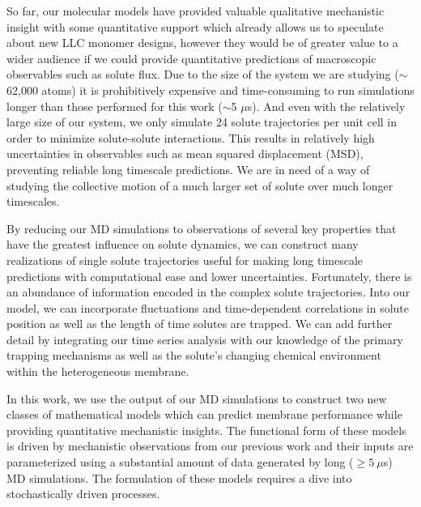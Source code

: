 \documentclass{article}
\begin{document}
  So far, our molecular models have provided valuable qualitative mechanistic insight 
  with some quantitative support which already allows us to speculate about new LLC
  monomer designs, however they would be of greater value to a wider audience if we 
  could provide quantitative predictions of macroscopic observables such as solute 
  flux. Due to the size of the system we are studying ($\sim$62,000 atoms) it is 
  prohibitively expensive and time-consuming to run simulations longer than 
  those performed for this work ($\sim$5 $\mu$s). And even with the relatively large 
  size of our system, we only simulate 24 solute trajectories per unit cell in order
  to minimize solute-solute interactions. This results in relatively high uncertainties
  in observables such as mean squared displacement (MSD), preventing reliable long
  timescale predictions. We are in need of a way of studying the collective motion
  of a much larger set of solute over much longer timescales.

  By reducing our MD simulations to observations of several key properties that 
  have the greatest influence on solute dynamics, we can construct many realizations
  of single solute trajectories useful for making long timescale predictions with 
  computational ease and lower uncertainties. Fortunately, there is an abundance of 
  information encoded in the complex solute trajectories. Into our model, we can 
  incorporate fluctuations and time-dependent correlations in solute position as well
  as the length of time solutes are trapped. We can add further detail by integrating
  our time series analysis with our knowledge of the primary trapping mechanisms as
  well as the solute's changing chemical environment within the heterogeneous membrane. 
  
  In this work, we use the output of our MD simulations to construct two new classes of 
  mathematical models which can predict membrane performance while providing quantitative 
  mechanistic insights. The functional form of these models is driven by mechanistic 
  observations from our previous work and their inputs are parameterized using a 
  substantial amount of data generated by long ($\geq 5~\mu$s) MD simulations. The formulation
  of these models requires a dive into stochastically driven processes.
  
\end{document}
